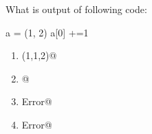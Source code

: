 \question
What is output of following code:

a = (1, 2)
a[0] +=1
\begin{enumerate}
\item \lstinline@(1,1,2)@
\item {}@
\item \lstinline@Type Error@
\item \lstinline@Syntax Error@
\end{enumerate}

